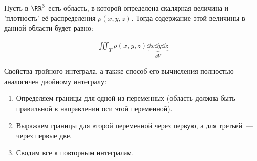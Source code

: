 
Пусть в \(\RR^3\) есть область, в которой определена скалярная величина и
'плотность' её распределения \(\rho(x, y, z)\). Тогда содержание этой величины
в данной области будет равно:

\begin{align*}
  \iiint_{T} \rho(x, y, z) \underbrace{\dd x \dd y \dd z}_{\dd V}
\end{align*}

\begin{remark}
  Свойства тройного интеграла, а также способ его вычисления полностью
  аналогичен двойному интегралу:
  \begin{enumerate}
    \item Определяем границы для одной из переменных (область должна быть
    правильной в направлении оси этой переменной).

    \item Выражаем границы для второй переменной через первую, а для третьей~---
    через первые две.

    \item Сводим все к повторным интегралам.
  \end{enumerate}
\end{remark}